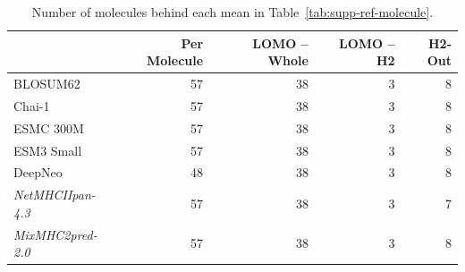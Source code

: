 \begin{table}[H]
\centering
\small
\caption{Number of molecules behind each mean in Table~\ref{tab:supp-ref-molecule}.}
\label{tab:supp-ref-molecule-n}
\begin{tabular}{lrrrr}
\toprule
 & \textbf{Per Molecule} & \textbf{LOMO -- Whole} & \textbf{LOMO -- H2} & \textbf{H2-Out} \\
\midrule
BLOSUM62 & 57 & 38 & 3 & 8 \\
Chai-1 & 57 & 38 & 3 & 8 \\
ESMC 300M & 57 & 38 & 3 & 8 \\
ESM3 Small & 57 & 38 & 3 & 8 \\
DeepNeo & 48 & 38 & 3 & 8 \\
\textit{NetMHCIIpan-4.3} & 57 & 38 & 3 & 7 \\
\textit{MixMHC2pred-2.0} & 57 & 38 & 3 & 8 \\
\bottomrule
\end{tabular}
\end{table}

